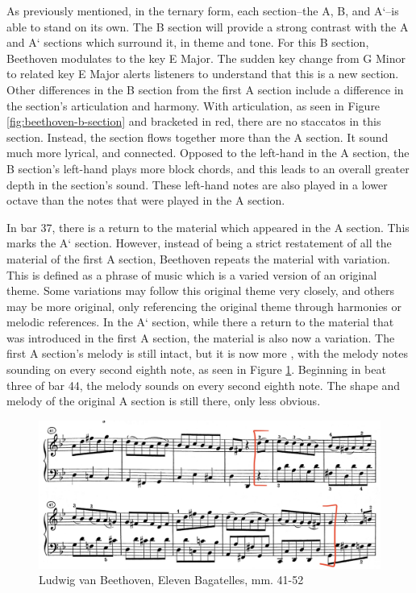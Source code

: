 As previously mentioned, in the ternary form, each section--the A, B, and A`--is able to stand on its own. The B section will provide a strong contrast with the A and A` sections which surround it, in theme and tone. For this B section, Beethoven modulates to the key E\musFlat{} Major. The sudden key change from G Minor to related key E\musFlat{} Major alerts listeners to understand that this is a new section. Other differences in the B section from the first A section include a difference in the section's articulation and harmony. With articulation, as seen in Figure \ref{fig:beethoven-b-section}\autocite{Henle_1978} and bracketed in red, there are no staccatos in this section. Instead, the section flows together more than the A section. It sound much more lyrical, and connected. Opposed to the left-hand in the A section, the B section's left-hand plays more block chords, and this leads to an overall greater depth in the section's sound. These left-hand notes are also played in a lower octave than the notes that were played in the A section. 

In bar 37, there is a return to the material which appeared in the A section. This marks the A` section. However, instead of being a strict restatement of all the material of the first A section, Beethoven repeats the material with variation. This is defined as a phrase of music which is a varied version of an original theme. Some variations may follow this original theme very closely, and others may be more original, only referencing the original theme through harmonies or melodic references.\autocite{Kennedy_Kennedy_Rutherford-Johnson_2013b} In the A` section, while there a return to the material that was introduced in the first A section, the material is also now a variation. The first A section's melody is still intact, but it is now more , with the melody notes sounding on every second eighth note, as seen in Figure \ref{fig:beethoven-a-prime-melody-variation}\autocite{Henle_1978}. Beginning in beat three of bar 44, the melody sounds on every second eighth note. The shape and melody of the original A section is still there, only less obvious.

\begin{figure}
	\centering
	\includegraphics[width=\textwidth]{figures/beethoven-a-prime-melody-variation}
	\caption{Ludwig van Beethoven, Eleven Bagatelles, mm. 41-52}
	\label{fig:beethoven-a-prime-melody-variation}
\end{figure}

